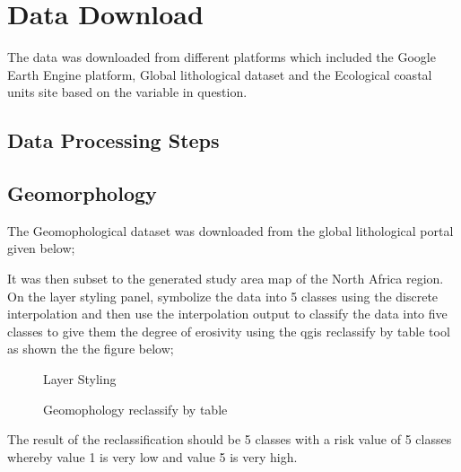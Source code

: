 \documentclass[letterpaper,10pt,english]{sphinxmanual}
\let\sphinxpxdimen\pdfpxdimen\else\newdimen\sphinxpxdimen
\begin{document}
\section{Data Download}
\label{\detokenize{Preprocessing/CVI:data-download}}
\sphinxAtStartPar
The data was downloaded from different platforms which included the Google Earth Engine platform, Global lithological dataset and the Ecological coastal units site based on the variable in question.


\subsection{Data Processing Steps}
\label{\detokenize{Preprocessing/CVI:data-processing-steps}}

\subsection{Geomorphology}
\label{\detokenize{Preprocessing/CVI:geomorphology}}
\sphinxAtStartPar
The Geomophological dataset was downloaded from the global lithological portal given below;

\label{\detokenize{Preprocessing/CVI:datapreparationoverview}}
\sphinxAtStartPar
It was then subset to the generated study area map of the North Africa region.
On the layer styling panel, symbolize the data into 5 classes using the discrete interpolation and then use the interpolation output to classify the data into five classes to give them the degree of erosivity using the qgis reclassify by table tool as shown the the figure below;

\begin{figure}[H]
\centering
\capstart

\noindent{}
\caption{Layer Styling}\label{\detokenize{Preprocessing/CVI:id3}}\end{figure}

\begin{figure}[H]
\centering
\capstart

\noindent\sphinxincludegraphics[width=800\sphinxpxdimen,height=400\sphinxpxdimen]{{GEOM}.png}
\caption{Geomophology reclassify by table}\label{\detokenize{Preprocessing/CVI:id4}}\end{figure}

\sphinxAtStartPar
The result of the re\sphinxhyphen{}classification should be 5 classes with a risk value of 5 classes whereby value 1 is very low and value 5 is very high.
\end{document}
